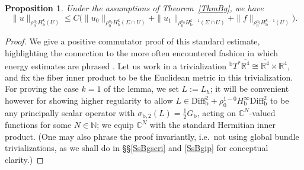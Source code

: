 \documentclass[reqno,11pt,letterpaper]{amsart}
\numberwithin{equation}{section}
\numberwithin{figure}{section}
\newtheorem{prop}[thm]{Proposition}
\theoremstyle{definition}
\theoremstyle{remark}
\newcommand{\C}{\mathbb{C}}
\newcommand{\N}{\mathbb{N}}
\newcommand{\R}{\mathbb{R}}
\newcommand{\ol}{\overline}
\newcommand{\bop}{{\mathrm{b}}}
\newcommand{\Diff}{\mathrm{Diff}}
\newcommand{\Diffb}{\Diff_\bop}
\newcommand{\Tb}{{}^{\bop}T}
\newcommand{\half}{\tfrac{1}{2}}
\newcommand{\Hb}{H_{\bop}}
\newcommand{\usref}[1]{{\upshape\ref{#1}}}
\begin{document}
\begin{prop}
\label{PropBgi0}
  Under the assumptions of Theorem~\usref{ThmBg}, we have
  \begin{equation}
  \label{EqBgi0Est}
    \| u \|_{\rho_0^{a_0}\Hb^k(U)} \leq C\bigl(\|u_0\|_{\rho_0^{a_0}\Hb^k(\Sigma\cap U)}+\|u_1\|_{\rho_0^{a_0}\Hb^{k-1}(\Sigma\cap U)} + \|f\|_{\rho_0^{a_0}\Hb^{k-1}(U)}\bigr).
  \end{equation}
\end{prop}
\begin{proof}
  We give a positive commutator proof of this standard estimate, highlighting the connection to the more often encountered fashion in which energy estimates are phrased \cite{DafermosRodnianskiLectureNotes}. Let us work in a trivialization $\Tb^*\ol{\R^4}\cong\ol{\R^4}\times\R^4$, and fix the fiber inner product to be the Euclidean metric in this trivialization. For proving the case $k=1$ of the lemma, we set $L:=L_h$; it will be convenient however for showing higher regularity to allow $L\in\Diffb^2+\rho_0^{1-0}\Hb^\infty\Diffb^2$ to be any principally scalar operator with $\sigma_{\bop,2}(L)=\half G_\bop$, acting on $\C^N$-valued functions for some $N\in\N$; we equip $\C^N$ with the standard Hermitian inner product. (One may also phrase the proof invariantly, i.e.\ not using global bundle trivializations, as we shall do in \S\S\ref{SsBgscri} and \ref{SsBgip} for conceptual clarity.)
  

\end{proof}
\end{document}

